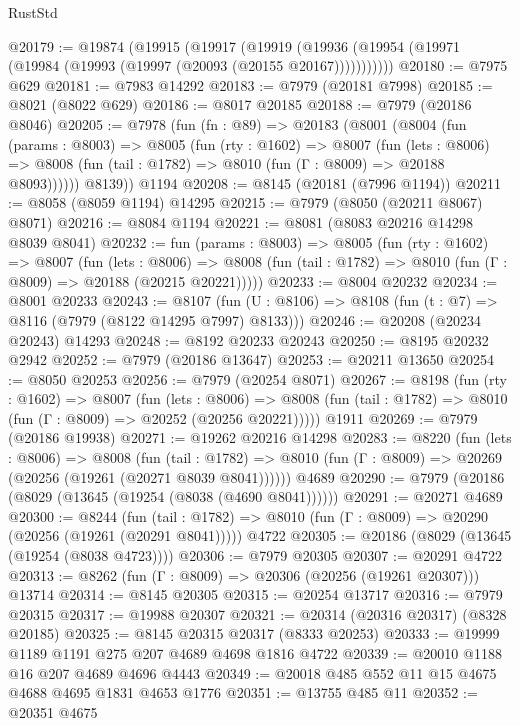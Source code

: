 \begin{lexlean}{RustStd}
\begin{coremodule}
@20179 := @19874
    (@19915
      (@19917
        (@19919 (@19936 (@19954 (@19971 (@19984 (@19993 (@19997 (@20093 (@20155 @20167)))))))))))
@20180 := @7975 @629
@20181 := @7983 @14292
@20183 := @7979 (@20181 @7998)
@20185 := @8021 (@8022 @629)
@20186 := @8017 @20185
@20188 := @7979 (@20186 @8046)
@20205 := @7978
    (fun (fn : @89) =>
    @20183
      (@8001
        (@8004
          (fun (params : @8003) =>
          @8005
            (fun (rty : @1602) =>
            @8007
              (fun (lets : @8006) =>
              @8008 (fun (tail : @1782) => @8010 (fun (Γ : @8009) => @20188 @8093))))))
        @8139))
    @1194
@20208 := @8145 (@20181 (@7996 @1194))
@20211 := @8058 (@8059 @1194) @14295
@20215 := @7979 (@8050 (@20211 @8067) @8071)
@20216 := @8084 @1194
@20221 := @8081 (@8083 @20216 @14298 @8039 @8041)
@20232 := fun (params : @8003) =>
  @8005
    (fun (rty : @1602) =>
    @8007
      (fun (lets : @8006) =>
      @8008 (fun (tail : @1782) => @8010 (fun (Γ : @8009) => @20188 (@20215 @20221)))))
@20233 := @8004 @20232
@20234 := @8001 @20233
@20243 := @8107
    (fun (U : @8106) => @8108 (fun (t : @7) => @8116 (@7979 (@8122 @14295 @7997) @8133)))
@20246 := @20208 (@20234 @20243) @14293
@20248 := @8192 @20233 @20243
@20250 := @8195 @20232 @2942
@20252 := @7979 (@20186 @13647)
@20253 := @20211 @13650
@20254 := @8050 @20253
@20256 := @7979 (@20254 @8071)
@20267 := @8198
    (fun (rty : @1602) =>
    @8007
      (fun (lets : @8006) =>
      @8008 (fun (tail : @1782) => @8010 (fun (Γ : @8009) => @20252 (@20256 @20221)))))
    @1911
@20269 := @7979 (@20186 @19938)
@20271 := @19262 @20216 @14298
@20283 := @8220
    (fun (lets : @8006) =>
    @8008
      (fun (tail : @1782) =>
      @8010 (fun (Γ : @8009) => @20269 (@20256 (@19261 (@20271 @8039 @8041))))))
    @4689
@20290 := @7979 (@20186 (@8029 (@13645 (@19254 (@8038 (@4690 @8041))))))
@20291 := @20271 @4689
@20300 := @8244
    (fun (tail : @1782) => @8010 (fun (Γ : @8009) => @20290 (@20256 (@19261 (@20291 @8041)))))
    @4722
@20305 := @20186 (@8029 (@13645 (@19254 (@8038 @4723))))
@20306 := @7979 @20305
@20307 := @20291 @4722
@20313 := @8262 (fun (Γ : @8009) => @20306 (@20256 (@19261 @20307))) @13714
@20314 := @8145 @20305
@20315 := @20254 @13717
@20316 := @7979 @20315
@20317 := @19988 @20307
@20321 := @20314 (@20316 @20317) (@8328 @20185)
@20325 := @8145 @20315 @20317 (@8333 @20253)
@20333 := @19999 @1189 @1191 @275 @207 @4689 @4698 @1816 @4722
@20339 := @20010 @1188 @16 @207 @4689 @4696 @4443
@20349 := @20018 @485 @552 @11 @15 @4675 @4688 @4695 @1831 @4653 @1776
@20351 := @13755 @485 @11
@20352 := @20351 @4675

\end{coremodule}
\end{lexlean}
